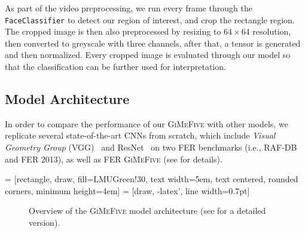 As part of the video preprocessing, 
we run every frame through the \texttt{FaceClassifier} to detect our region of interest, 
and crop the rectangle region. 
The cropped image is then also preprocessed by resizing to $64 \times 64$ resolution, 
then converted to greyscale with three channels, 
after that, a tensor is generated and then normalized. 
Every cropped image is evaluated through our model so that the classification can be further used for interpretation. 

\subsection{Model Architecture}
\label{sec:setup:model}

In order to compare the performance of our \textsc{GiMeFive} with other models, 
we replicate several state-of-the-art CNNs from scratch, 
which include \textit{Visual Geometry Group} (VGG)~\cite{SimonyanZ14a} and 
ResNet~\cite{HeZRS16} on two FER benchmarks (i.e., RAF-DB and FER 2013), 
as well as FER \textsc{GiMeFive} (see  for details). 

 = [rectangle, draw, fill=LMUGreen!30, text width=5em, text centered, rounded corners, minimum height=4em]
 = [draw, -latex', line width=0.7pt]

\begin{figure}[ht]
  \centering
  \caption{Overview of the \textsc{GiMeFive} model architecture 
  (see  for a detailed version).} 
  \label{fig:model}
\end{figure}

